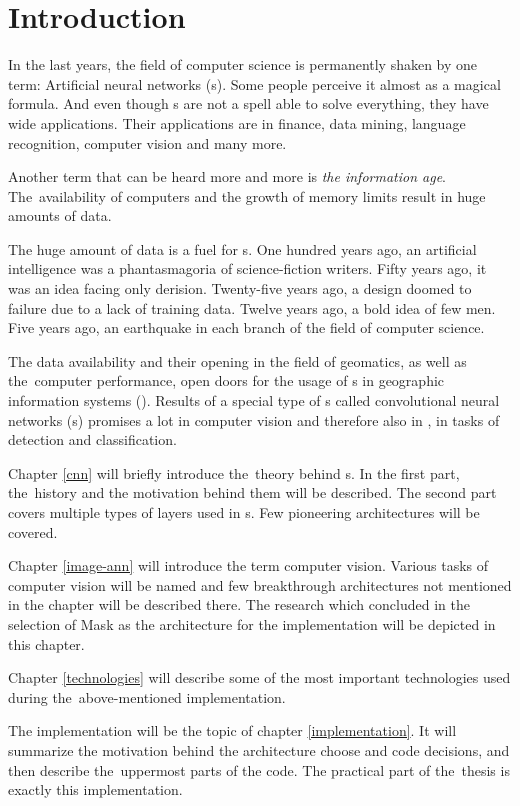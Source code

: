 \chapter{Introduction}
\label{intro}

In the last years, the field of computer science is permanently shaken by one 
term: Artificial neural networks (s). Some people perceive it almost
as a magical formula. And even though s are not a spell able to solve
everything, they have wide applications. Their applications are in finance,
data mining, language recognition, computer vision and many more.

Another term that can be heard more and more is \textit{the information age}.
The~availability of computers and the growth of memory limits result in huge
amounts of data.

The huge amount of data is a fuel for s. One hundred years ago, an
artificial intelligence was a phantasmagoria of science-fiction writers. Fifty
years ago, it was an idea facing only derision. Twenty-five years ago, a design
doomed to failure due to a lack of training data. Twelve years ago, a bold idea
of few men. Five years ago, an earthquake in each branch of the field of
computer science.

The data availability and their opening in the field of geomatics, as well as
the~computer performance, open doors for the usage of s in geographic
information systems (). Results of a special type of s called
convolutional neural networks (s) promises a lot in computer vision and
therefore also in , in tasks of detection and classification.

Chapter \ref{cnn} will briefly introduce the~theory behind s. In the
first part, the~history and the motivation behind them will be described. The
second part covers multiple types of layers used in s. Few pioneering
architectures will be covered.

Chapter \ref{image-ann} will introduce the term computer vision. Various tasks
of computer vision will be named and few breakthrough architectures not 
mentioned in the  chapter will be described there. The research which 
concluded in the selection of Mask  as the architecture for the 
implementation will be depicted in this chapter.

Chapter \ref{technologies} will describe some of the most important 
technologies used during
the~above-mentioned implementation.

The implementation will be the topic of chapter \ref{implementation}. It will 
summarize the motivation behind the architecture choose and code decisions, and
then describe the~uppermost parts of the code. The practical part of the~thesis
is exactly this implementation.
